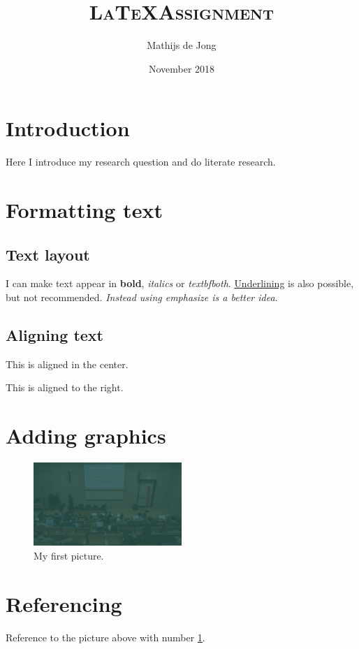 \documentclass{article}
\title{\textsc{\LaTeX Assignment}}
\author{Mathijs de Jong}
\date{November 2018}
\begin{document}
\maketitle

\section{Introduction}
Here I introduce my research question and do literate research.

\section{Formatting text}
\subsection{Text layout}
I can make text appear in \textbf{bold}, \textit{italics} or \textit{textbf{both}}. \underline{Underlining} is also possible, but not recommended. \emph{Instead using emphasize is a better idea}.

\subsection{Aligning text}
\begin{center}
This is aligned in the center.
\end{center}

\begin{flushright}
This is aligned to the right.
\end{flushright}

\section{Adding graphics}
\begin{figure}[H]
\includegraphics[width=0.5\textwidth]{resources/TSR_background_1.pdf}
\caption{My first picture.}
\label{fig: my-first-picture}
\end{figure}

\section{Referencing}
Reference to the picture above with number \ref{fig: my-first-picture}.
\end{document}
